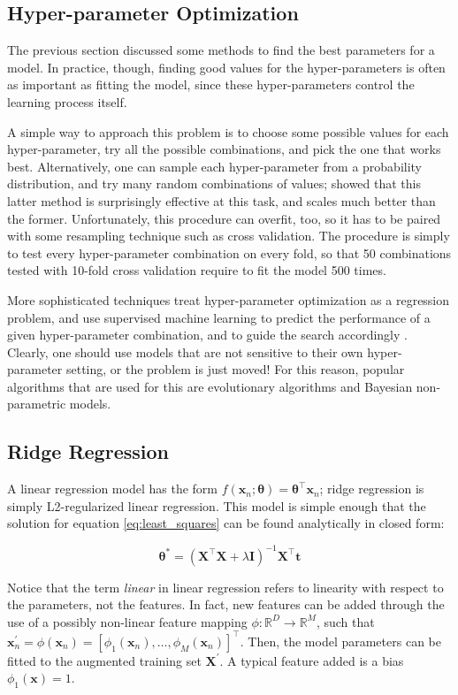 \documentclass[12pt]{book}
\begin{document}
\subsection{Hyper-parameter Optimization}
The previous section discussed some methods to find the best parameters for a model. In practice, though, finding good values for the hyper-parameters is often as important as fitting the model, since these hyper-parameters control the learning process itself.

A simple way to approach this problem is to choose some possible values for each hyper-parameter, try all the possible combinations, and pick the one that works best. Alternatively, one can sample each hyper-parameter from a probability distribution, and try many random combinations of values; \cite{random_search} showed that this latter method is surprisingly effective at this task, and scales much better than the former. Unfortunately, this procedure can overfit, too, so it has to be paired with some resampling technique such as cross validation. The procedure is simply to test every hyper-parameter combination on every fold, so that 50 combinations tested with 10-fold cross validation require to fit the model 500 times.

More sophisticated techniques treat hyper-parameter optimization as a regression problem, and use supervised machine learning to predict the performance of a given hyper-parameter combination, and to guide the search accordingly \citep{hyperopt}. Clearly, one should use models that are not sensitive to their own hyper-parameter setting, or the problem is just moved! For this reason, popular algorithms that are used for this are evolutionary algorithms and Bayesian non-parametric models.

\subsection{Ridge Regression}
A linear regression model has the form $f(\bm x_n;\bm\theta)=\bm\theta^\intercal\bm x_n$; ridge regression is simply L2-regularized linear regression. This model is simple enough that the solution for equation \ref{eq:least_squares} can be found analytically in closed form:

\begin{equation}
\label{eq:ridge_solution}
\bm\theta^*=(\bm X^\intercal\bm X+\lambda\bm I)^{-1}\bm X^\intercal\bm t
\end{equation}

Notice that the term \emph{linear} in linear regression refers to linearity with respect to the parameters, not the features. In fact, new features can be added through the use of a possibly non-linear feature mapping $\phi:\mathbb{R}^D\rightarrow\mathbb{R}^M$, such that $\bm x^\prime_n=\phi(\bm x_n)=\left[\phi_1(\bm x_n),\ldots,\phi_M(\bm x_n)\right]^\intercal$. Then, the model parameters can be fitted to the augmented training set $\bm X^\prime$. A typical feature added is a bias $\phi_1(\bm x)=1$.
\end{document}
